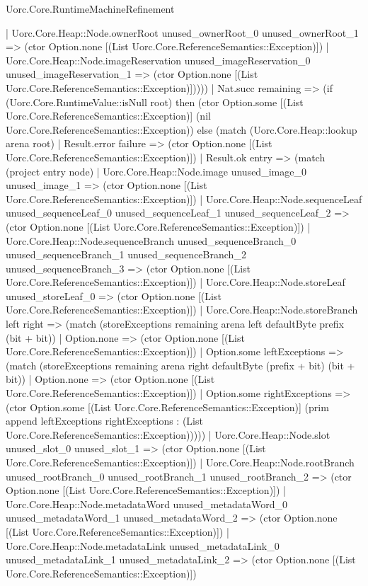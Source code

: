 \begin{lexlean}{Uorc.Core.RuntimeMachineRefinement}
\begin{semanticmodule}
{        | Uorc.Core.Heap::Node.ownerRoot unused_ownerRoot_0 unused_ownerRoot_1 => (ctor Option.none [(List Uorc.Core.ReferenceSemantics::Exception)])
        | Uorc.Core.Heap::Node.imageReservation unused_imageReservation_0 unused_imageReservation_1 => (ctor Option.none [(List Uorc.Core.ReferenceSemantics::Exception)]))))
    | Nat.succ remaining => (if (Uorc.Core.RuntimeValue::isNull root) then (ctor Option.some [(List Uorc.Core.ReferenceSemantics::Exception)] (nil Uorc.Core.ReferenceSemantics::Exception)) else (match (Uorc.Core.Heap::lookup arena root)
      | Result.error failure => (ctor Option.none [(List Uorc.Core.ReferenceSemantics::Exception)])
      | Result.ok entry => (match (project entry node)
        | Uorc.Core.Heap::Node.image unused_image_0 unused_image_1 => (ctor Option.none [(List Uorc.Core.ReferenceSemantics::Exception)])
        | Uorc.Core.Heap::Node.sequenceLeaf unused_sequenceLeaf_0 unused_sequenceLeaf_1 unused_sequenceLeaf_2 => (ctor Option.none [(List Uorc.Core.ReferenceSemantics::Exception)])
        | Uorc.Core.Heap::Node.sequenceBranch unused_sequenceBranch_0 unused_sequenceBranch_1 unused_sequenceBranch_2 unused_sequenceBranch_3 => (ctor Option.none [(List Uorc.Core.ReferenceSemantics::Exception)])
        | Uorc.Core.Heap::Node.storeLeaf unused_storeLeaf_0 => (ctor Option.none [(List Uorc.Core.ReferenceSemantics::Exception)])
        | Uorc.Core.Heap::Node.storeBranch left right => (match (storeExceptions remaining arena left defaultByte prefix (bit + bit))
          | Option.none => (ctor Option.none [(List Uorc.Core.ReferenceSemantics::Exception)])
          | Option.some leftExceptions => (match (storeExceptions remaining arena right defaultByte (prefix + bit) (bit + bit))
            | Option.none => (ctor Option.none [(List Uorc.Core.ReferenceSemantics::Exception)])
            | Option.some rightExceptions => (ctor Option.some [(List Uorc.Core.ReferenceSemantics::Exception)] (prim append leftExceptions rightExceptions : (List Uorc.Core.ReferenceSemantics::Exception)))))
        | Uorc.Core.Heap::Node.slot unused_slot_0 unused_slot_1 => (ctor Option.none [(List Uorc.Core.ReferenceSemantics::Exception)])
        | Uorc.Core.Heap::Node.rootBranch unused_rootBranch_0 unused_rootBranch_1 unused_rootBranch_2 => (ctor Option.none [(List Uorc.Core.ReferenceSemantics::Exception)])
        | Uorc.Core.Heap::Node.metadataWord unused_metadataWord_0 unused_metadataWord_1 unused_metadataWord_2 => (ctor Option.none [(List Uorc.Core.ReferenceSemantics::Exception)])
        | Uorc.Core.Heap::Node.metadataLink unused_metadataLink_0 unused_metadataLink_1 unused_metadataLink_2 => (ctor Option.none [(List Uorc.Core.ReferenceSemantics::Exception)])
}
\end{semanticmodule}
\end{lexlean}
